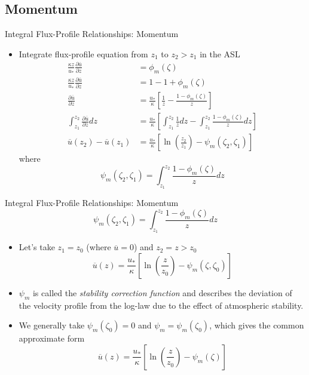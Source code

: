 \subsection{Momentum}
\begin{frame}{Integral Flux-Profile Relationships: Momentum}
\begin{itemize}
	\item Integrate flux-profile equation from $z_1$ to $z_2>z_1$ in the ASL
	\begin{align*}
		\frac{\kappa z}{u_*} \frac{\partial \overline{u}}{\partial z} &= \phi_m(\zeta)\\
		\frac{\kappa z}{u_*} \frac{\partial \overline{u}}{\partial z} &= 1 -1 + \phi_m(\zeta)\\
		\frac{\partial \overline{u}}{\partial z} &= \frac{u_*}{\kappa}\left[ \frac{1}{z} - \frac{1-\phi_m(\zeta)}{z}\right]\\
		\int^{z_2}_{z_1} \frac{\partial \overline{u}}{\partial z} dz &= \frac{u_*}{\kappa} \left[ \int^{z_2}_{z_1} \frac{1}{z} dz - \int^{z_2}_{z_1} \frac{1-\phi_m(\zeta)}{z} dz \right]\\
		\overline{u}(z_2) - \overline{u}(z_1) &= \frac{u_*}{\kappa}\left[\ln\left(\frac{z_2}{z_1}\right) - \psi_m\left(\zeta_2, \zeta_1\right)\right]
	\end{align*}
	where $$\psi_m\left(\zeta_2, \zeta_1\right) = \int^{z_2}_{z_1} \frac{1-\phi_m(\zeta)}{z} dz$$
\end{itemize}
\end{frame}
\begin{frame}{Integral Flux-Profile Relationships: Momentum}
$$\psi_m\left(\zeta_2, \zeta_1\right) = \int^{z_2}_{z_1} \frac{1-\phi_m(\zeta)}{z} dz$$
\begin{itemize}
	\item Let's take $z_1=z_0$ (where $\overline{u}=0$) and $z_2=z>z_0$
	$$\overline{u}(z) = \frac{u_*}{\kappa}\left[\ln\left(\frac{z}{z_0}\right) - \psi_m\left(\zeta, \zeta_0\right)\right]$$
	\item $\psi_m$ is called the \textit{stability correction function} and describes the deviation of the velocity profile from the log-law due to the effect of atmospheric stability.
	\item We generally take $\psi_m(\zeta_0) = 0$ and $\psi_m = \psi_m(\zeta_0)$, which gives the common approximate form
	$$\boxed{\overline{u}(z) = \frac{u_*}{\kappa}\left[\ln\left(\frac{z}{z_0}\right) - \psi_m(\zeta)\right]}$$
\end{itemize}
\end{frame}
